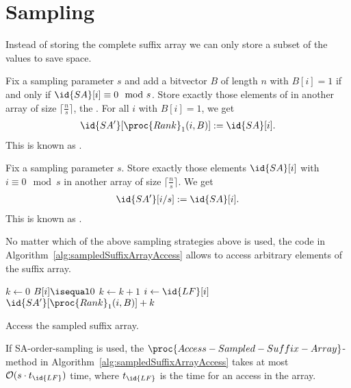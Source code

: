 \section{Sampling}

Instead of storing the complete suffix array we can only store a subset of the values to save space.

\begin{Definition}
  Fix a sampling parameter $s$ and add a bitvector $B$ of length $n$ with $B[i] = 1$ if and only if $\id{SA}[i] \equiv 0 \mod s$. Store exactly those elements of  in another array  of size $\lceil \frac{n}{s} \rceil$, the . For all $i$ with $B[i] = 1$, we get
  \begin{align}
    \id{SA'}[\proc{Rank}_1(i, B)] := \id{SA}[i]
    \text{.}
  \end{align}
  This is known as .
\end{Definition}

\begin{Definition}
  Fix a sampling parameter $s$. Store exactly those elements $\id{SA}[i]$ with $i \equiv 0 \mod s$ in another array  of size $\lceil \frac{n}{s} \rceil$. We get
  \begin{align}
    \id{SA'}[i/s] := \id{SA}[i]
    \text{.}
  \end{align}
  This is known as .
\end{Definition}

No matter which of the above sampling strategies above is used, the code in Algorithm~\ref{alg:sampledSuffixArrayAccess} allows to access arbitrary elements of the suffix array.

\begin{algorithm}[htb]
  \begin{codebox}
  \li $k \gets 0$
  \li \While $B[i] \isequal 0$
      \Do
  \li   $k \gets k + 1$
  \li   $i \gets \id{LF}[i]$    
      \End
  \li \Return $\id{SA'}[\proc{Rank}_1(i, B)] + k$
  \end{codebox}
  \caption{Access the sampled suffix array.}
  \label{alg:sampledSuffixArrayAccess}
\end{algorithm}

\begin{Theorem}
  \label{thm:sampledSuffixArrayAccess}
  If SA-order-sampling is used, the $\proc{Access-Sampled-Suffix-Array}$-method in Algorithm~\ref{alg:sampledSuffixArrayAccess} takes at most $\mathcal{O}(s\cdot t_{\id{LF}})$ time, where $t_{\id{LF}}$ is the time for an access in the  array.
\end{Theorem}

